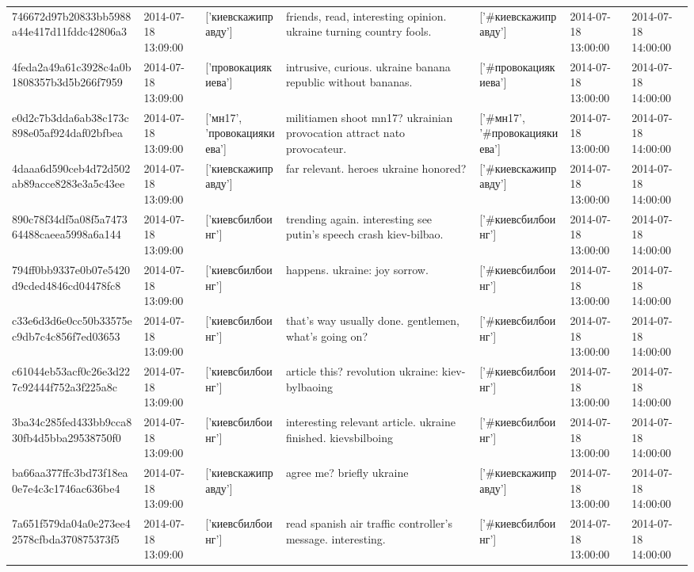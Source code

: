 \begin{tabular}{lllllll}
746672d97b20833bb5988a44e417d11fddc42806a3 & 2014-07-18 13:09:00 & ['киевскажиправду'] & friends, read, interesting opinion. ukraine turning country fools. & ['#киевскажиправду'] & 2014-07-18 13:00:00 & 2014-07-18 14:00:00 \\
4feda2a49a61c3928c4a0b1808357b3d5b266f7959 & 2014-07-18 13:09:00 & ['провокациякиева'] & intrusive, curious. ukraine banana republic without bananas. & ['#провокациякиева'] & 2014-07-18 13:00:00 & 2014-07-18 14:00:00 \\
e0d2c7b3dda6ab38c173c898e05af924daf02bfbea & 2014-07-18 13:09:00 & ['мн17', 'провокациякиева'] & militiamen shoot mn17? ukrainian provocation attract nato provocateur. & ['#мн17', '#провокациякиева'] & 2014-07-18 13:00:00 & 2014-07-18 14:00:00 \\
4daaa6d590ceb4d72d502ab89acce8283e3a5c43ee & 2014-07-18 13:09:00 & ['киевскажиправду'] & far relevant. heroes ukraine honored? & ['#киевскажиправду'] & 2014-07-18 13:00:00 & 2014-07-18 14:00:00 \\
890c78f34df5a08f5a747364488caeea5998a6a144 & 2014-07-18 13:09:00 & ['киевсбилбоинг'] & trending again. interesting see putin's speech crash kiev-bilbao. & ['#киевсбилбоинг'] & 2014-07-18 13:00:00 & 2014-07-18 14:00:00 \\
794ff0bb9337e0b07e5420d9cded4846cd04478fc8 & 2014-07-18 13:09:00 & ['киевсбилбоинг'] & happens. ukraine: joy sorrow. & ['#киевсбилбоинг'] & 2014-07-18 13:00:00 & 2014-07-18 14:00:00 \\
c33e6d3d6e0cc50b33575ec9db7c4c856f7ed03653 & 2014-07-18 13:09:00 & ['киевсбилбоинг'] & that's way usually done. gentlemen, what's going on? & ['#киевсбилбоинг'] & 2014-07-18 13:00:00 & 2014-07-18 14:00:00 \\
c61044eb53acf0c26e3d227c92444f752a3f225a8c & 2014-07-18 13:09:00 & ['киевсбилбоинг'] & article this? revolution ukraine: kiev-bylbaoing & ['#киевсбилбоинг'] & 2014-07-18 13:00:00 & 2014-07-18 14:00:00 \\
3ba34c285fed433bb9cca830fb4d5bba29538750f0 & 2014-07-18 13:09:00 & ['киевсбилбоинг'] & interesting relevant article. ukraine finished. kievsbilboing & ['#киевсбилбоинг'] & 2014-07-18 13:00:00 & 2014-07-18 14:00:00 \\
ba66aa377ffc3bd73f18ea0e7e4c3c1746ac636be4 & 2014-07-18 13:09:00 & ['киевскажиправду'] & agree me? briefly ukraine & ['#киевскажиправду'] & 2014-07-18 13:00:00 & 2014-07-18 14:00:00 \\
7a651f579da04a0e273ee42578cfbda370875373f5 & 2014-07-18 13:09:00 & ['киевсбилбоинг'] & read spanish air traffic controller's message. interesting. & ['#киевсбилбоинг'] & 2014-07-18 13:00:00 & 2014-07-18 14:00:00 \\

\end{tabular}
